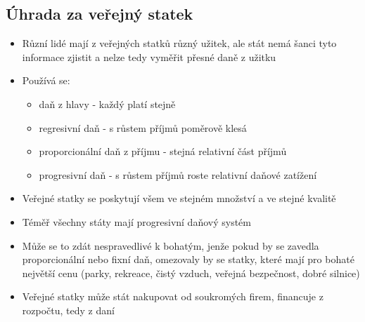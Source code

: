 \subsection{Úhrada za veřejný statek}
\begin{itemize}
    \item Různí lidé mají z veřejných statků různý užitek, ale stát nemá šanci tyto informace zjistit a nelze tedy
    vyměřit přesné daně z užitku
    \item Používá se:
    \begin{itemize}
        \item daň z hlavy - každý platí stejně
        \item regresivní daň - s růstem příjmů poměrově klesá
        \item proporcionální daň z příjmu - stejná relativní část příjmů
        \item progresivní daň - s růstem příjmů roste relativní daňové zatížení
    \end{itemize}
    \item Veřejné statky se poskytují všem ve stejném množství a ve stejné kvalitě
    \item Téměř všechny státy mají progresivní daňový systém
    \item Může se to zdát nespravedlivé k bohatým, jenže pokud by se zavedla proporcionální nebo fixní daň, omezovaly by 
    se statky, které mají pro bohaté největší cenu (parky, rekreace, čistý vzduch, veřejná bezpečnost, dobré silnice)
    \item Veřejné statky může stát nakupovat od soukromých firem, financuje z rozpočtu, tedy z daní
\end{itemize}
